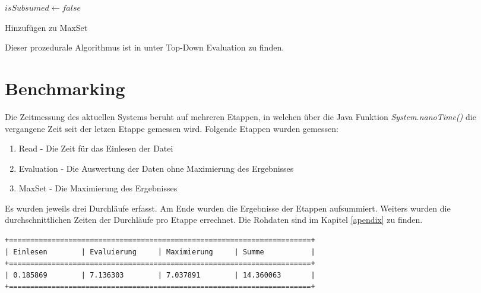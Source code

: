 \documentclass[draft,final]{vutinfth} %
\begin{document}
\begin{algorithm}
\BlankLine
$isSubsumed\leftarrow false$\;
\BlankLine
{}
\caption{Hinzufügen zu MaxSet}\label{alg:max}
\end{algorithm}

Dieser prozedurale Algorithmus ist in \cite{OptMat} unter Top-Down Evaluation zu finden.

\pagebreak

\section{Benchmarking} \label{benchmarking}

Die Zeitmessung des aktuellen Systems beruht auf mehreren Etappen, in welchen über die Java Funktion \textit{System.nanoTime()} die vergangene Zeit seit der letzen Etappe gemessen wird. Folgende Etappen wurden gemessen:
\begin{enumerate}
	\item Read - Die Zeit für das Einlesen der Datei
	\item Evaluation - Die Auswertung der Daten ohne Maximierung des Ergebnisses
	\item MaxSet - Die Maximierung des Ergebnisses
\end{enumerate}

Es wurden jeweils drei Durchläufe erfasst. Am Ende wurden die Ergebnisse der Etappen aufsummiert. Weiters wurden die durchschnittlichen Zeiten der Durchläufe pro Etappe errechnet. Die Rohdaten sind im Kapitel \ref{apendix} zu finden.

\begin{lstlisting}[basicstyle=\tiny,caption={Benchmark ITERATIVE, Datei: lubm-ex-20-15.sparql.xml},label={lst:bi15}]
+=======================================================================+
| Einlesen        | Evaluierung     | Maximierung     | Summe           | 
+=======================================================================+
| 0.185869        | 7.136303        | 7.037891        | 14.360063       |
+=======================================================================+
\end{lstlisting}
\end{document}
